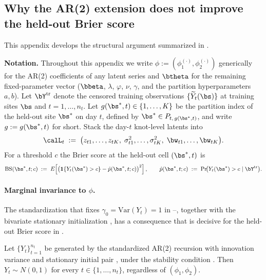 \subsection{Why the AR(2) extension does not improve the held-out Brier score}\label{app:why-ar2}

This appendix develops the structural argument summarized in .

\medskip\noindent\textbf{Notation.}  Throughout this appendix we write $\phi := (\phi_1^{(\cdot)}, \phi_2^{(\cdot)})$ generically for the AR(2) coefficients of any latent series and $\btheta$ for the remaining fixed-parameter vector ($\bbeta$, $\lambda$, $\varphi$, $\nu$, $\gamma$, and the partition hyperparameters $a, b$).  Let $\bY^{\mathrm{tr}}$ denote the censored training observations $\{\widetilde Y_t(\bs)\}$ at training sites $\bs$ and $t = 1, \ldots, n_t$.  Let $g(\bs^*, t) \in \{1, \ldots, K\}$ be the partition index of the held-out site $\bs^*$ on day $t$, defined by $\bs^* \in P_{t,\,g(\bs^*, t)}$, and write $g := g(\bs^*, t)$ for short.  Stack the day-$t$ knot-level latents into
\begin{align}
  \calL_t \;:=\; \big(z_{t1}, \ldots, z_{tK},\; \sigma^2_{t1}, \ldots, \sigma^2_{tK},\; \bw_{t1}, \ldots, \bw_{tK}\big).
  \label{eq:Lt-disc}
\end{align}
For a threshold $c$ the Brier score at the held-out cell $(\bs^*, t)$ is
\begin{align}
  \mathrm{BS}(\bs^*, t; c) \;:=\;
   E\!\left[\big(\mathbf 1\{Y_t(\bs^*) > c\} - \hat p(\bs^*, t; c)\big)^2\right],
  \qquad
  \hat p(\bs^*, t; c) \;:=\; \mathrm{Pr}\!\big(Y_t(\bs^*) > c \mid \bY^{\mathrm{tr}}\big).
  \label{eq:brier-disc}
\end{align}

\paragraph{Marginal invariance to $\phi$.}

The standardization that fixes $\gamma_0 = \mathrm{Var}(Y_t) = 1$ in --, together with the bivariate stationary initialization , has a consequence that is decisive for the held-out Brier score in .

\begin{proposition}\label{prop:marginal-invariance}
Let $\{Y_t\}_{t=1}^{n_t}$ be generated by the standardized AR(2) recursion  with innovation variance  and stationary initial pair , under the stability condition .  Then $Y_t \sim N(0,1)$ for every $t \in \{1, \ldots, n_t\}$, regardless of $(\phi_1, \phi_2)$.
\end{proposition}

